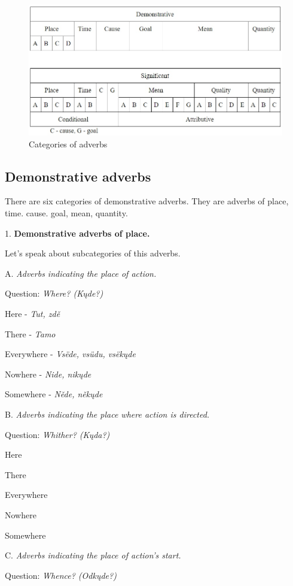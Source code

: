 \begin{figure}
	\includegraphics[width=\linewidth]{./sources/adverbs.jpg}
	\caption{Categories of adverbs}
	\label{fig:adverbs}
\end{figure}

\subsection{Demonstrative adverbs}

There are six categories of demonstrative adverbs. They are adverbs of place, time. cause. goal, mean, quantity.

1. \textbf{Demonstrative adverbs of place.}

Let’s speak about subcategories of this adverbs. 

A. \textit{Adverbs indicating the place of action.}

Question: \textit{Where? (Kųde?)}

Here - \textit{Tut, zdě}

There - \textit{Tamo}

Everywhere - \textit{Vsëde, vsüdu, vsëkųde}

Nowhere - \textit{Nide, nikųde}

Somewhere - \textit{Něde, někųde}

B. \textit{Adverbs indicating the place where action is directed. }

Question: \textit{Whither? (Kųda?)}

Here

There

Everywhere

Nowhere

Somewhere


C. \textit{Adverbs indicating the place of action’s start.}

Question: \textit{Whence? (Odkųde?)}

